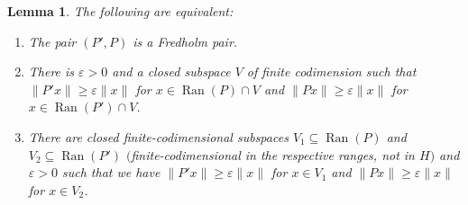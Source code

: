 \documentclass[pdftex]{sigma}
\numberwithin{equation}{section}
\newtheorem{Lemma}[Theorem]{Lemma}
\DeclareMathOperator{\Ran}{Ran}
\begin{document}
\begin{Lemma}\label{11}
		The following are equivalent:
		\begin{enumerate}\itemsep=0pt
\item[$(1)$] The pair $({P'},P)$ is a Fredholm pair.
\item[$(2)$] There is $\varepsilon>0$ and a closed subspace $V$ of finite codimension such that  ${\|{P'}x\| \geq \varepsilon\|x\|}$ for $x\in \Ran(P)\cap V$ and $\|Px\|\geq\varepsilon\|x\|$ for $x\in \Ran({P'})\cap V$.
\item[$(3)$] There are closed finite-codimensional subspaces $V_1\subseteq \Ran(P)$ and $V_2\subseteq\Ran({P'})$ $($finite-codimensional in the respective ranges, not in $H)$ and $\varepsilon>0$ such that we have  $\|{P'}x\|\geq\varepsilon\|x\|$ for $x\in V_1$ and $\|Px\|\geq\varepsilon\|x\|$ for $x\in V_2$.
\end{enumerate}
\end{Lemma}
\end{document}
